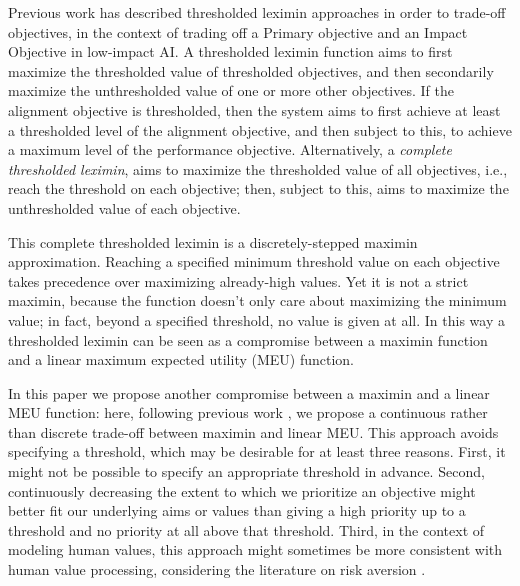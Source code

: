 Previous work \cite{vamplew_potential-based_2021} has described thresholded leximin approaches in order to trade-off objectives, in the context of trading off a Primary objective and an Impact Objective in low-impact AI. A thresholded leximin function aims to first maximize the thresholded value of thresholded objectives, and then secondarily maximize the unthresholded value of one or more other objectives. If the alignment objective is thresholded, then the system aims to first achieve at least a thresholded level of the alignment objective, and then subject to this, to achieve a maximum level of the performance objective. Alternatively, a \textit{complete thresholded leximin}, aims to maximize the thresholded value of all objectives, i.e., reach the threshold on each objective; then, subject to this, aims to maximize the unthresholded value of each objective.

This complete thresholded leximin is a discretely-stepped maximin approximation. Reaching a specified minimum threshold value on each objective takes precedence over maximizing already-high values. Yet it is not a strict maximin, because the function doesn't only care about maximizing the minimum value; in fact, beyond a specified threshold, no value is given at all. In this way a thresholded leximin can be seen as a compromise between a maximin function and a linear maximum expected utility (MEU) function.

In this paper we propose another compromise between a maximin and a linear MEU function: here, following previous work \cite{rolf_need_2020}, we propose a continuous rather than discrete trade-off between maximin and linear MEU. This approach avoids specifying a threshold, which may be desirable for at least three reasons. First, it might not be possible to specify an appropriate threshold in advance. Second, continuously decreasing the extent to which we prioritize an objective might better fit our underlying aims or values than giving a high priority up to a threshold and no priority at all above that threshold. %
Third, in the context of modeling human values, this approach might sometimes be more consistent with human value processing\cite{Tom515}, considering the literature on risk aversion \cite{pratt1978risk}.


